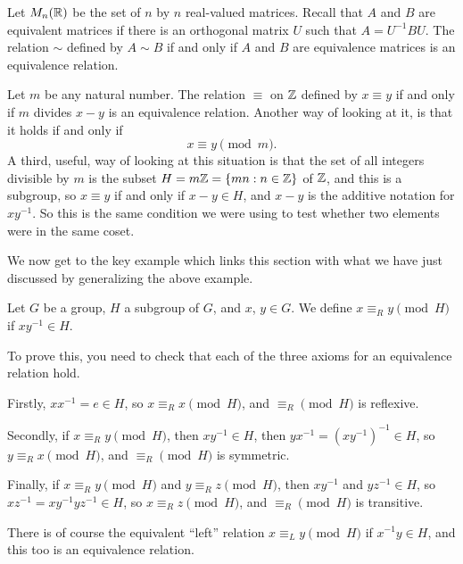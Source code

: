 \begin{example}\label{eg:matrixconjugate}
  Let $M_{n}(\mathbb{R})$ be the set of $n$ by $n$ real-valued matrices.  Recall
  that $A$ and $B$ are equivalent matrices if there is an orthogonal matrix
  $U$ such that $A = U^{-1}BU$.  The relation $\sim$ defined by $A \sim B$ if
  and only if $A$ and $B$ are equivalence matrices is an equivalence relation.
\end{example}

\begin{example}\label{eg:modequivclass}
  Let $m$ be any natural number.  The relation $\equiv$ on $\mathbb{Z}$
  defined by $x \equiv y$ if and only if $m$ divides $x-y$ is an equivalence
  relation.  Another way of looking at it, is that it holds if and only if
  \[
    x \equiv y \pmod{m}.
  \]
  A third, useful, way of looking at this situation is that the set of
  all integers divisible by $m$ is the subset $H = m\mathbb{Z} =
  \{ mn : n \in \mathbb{Z}\}$ of $\mathbb{Z}$, and this is a subgroup, so
  $x \equiv y$ if and only if $x - y \in H$, and $x-y$ is the additive notation
  for $xy^{-1}$.  So this is the same condition we were using to test whether
  two elements were in the same coset.
\end{example}

We now get to the key example which links this section with what we have
just discussed by generalizing the above example.

\begin{example}
  Let $G$ be a group, $H$ a subgroup of $G$, and $x$, $y \in G$.  We define
  $x \equiv_{R} y \pmod{H}$ if $xy^{-1} \in H$.
  
  To prove this, you need to check that each of the three axioms for an 
  equivalence relation hold.
  
  Firstly, $xx^{-1} = e \in H$, so $x \equiv_{R} x \pmod{H}$, and $\equiv_{R} \pmod{H}$ is reflexive.
  
  Secondly, if $x \equiv_{R} y \pmod{H}$, then $xy^{-1} \in H$, then
  $yx^{-1} = (xy^{-1})^{-1} \in H$, so $y \equiv_{R} x \pmod{H}$, and $\equiv_{R} \pmod{H}$ is symmetric.
  
  Finally, if $x \equiv_{R} y \pmod{H}$ and $y \equiv_{R} z \pmod{H}$, then $xy^{-1}$ and $yz^{-1} \in H$,
  so $xz^{-1} = xy^{-1}yz^{-1} \in H$, so $x \equiv_{R} z \pmod{H}$, and $\equiv_{R} \pmod{H}$ is transitive.
  
  There is of course the equivalent ``left'' relation $x \equiv_{L} y \pmod{H}$ if $x^{-1}y \in H$,
  and this too is an equivalence relation.
\end{example}

